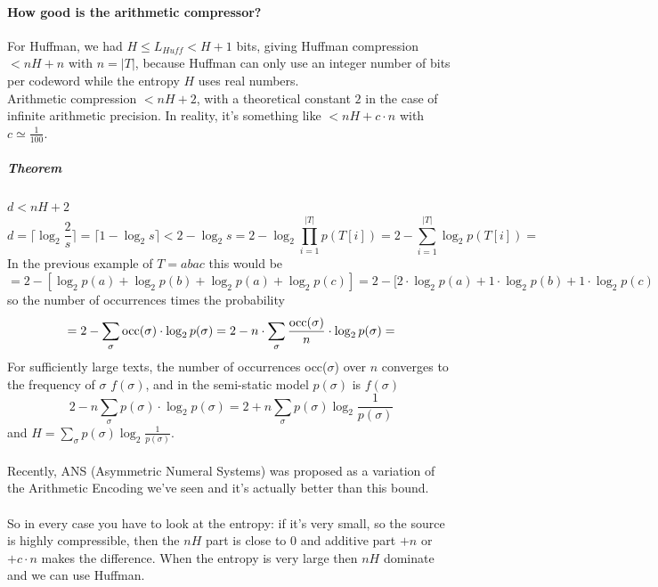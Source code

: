 \documentclass[10pt]{report}
\begin{document}
\paragraph{How good is the arithmetic compressor?} For Huffman, we had $H\leq L_{Huff} < H+1$ bits, giving Huffman compression $< nH+n$ with $n=|T|$, because Huffman can only use an integer number of bits per codeword while the entropy $H$ uses real numbers.\\
Arithmetic compression $< nH + 2$, with a theoretical constant $2$ in the case of infinite arithmetic precision. In reality, it's something like $< nH + c\cdot n$ with $c\simeq\frac{1}{100}$.
\subparagraph{Theorem} $d< nH + 2$
$$d = \lceil\log_2\frac{2}{s}\rceil = \lceil 1-\log_2 s\rceil < 2 - \log_2 s = 2-\log_2\prod_{i=1}^{|T|}p(T[i]) = 2 - \sum_{i=1}^{|T|} \log_2 p(T[i]) =$$
In the previous example of $T = abac$ this would be $=2- [\log_2 p(a)+\log_2 p(b)+\log_2 p(a) + \log_2 p(c)] = 2 - [2\cdot\log_2 p(a) + 1\cdot\log_2 p(b) + 1\cdot \log_2 p(c)$ so the number of occurrences times the probability
$$ = 2 - \sum_\sigma \hbox{occ}(\sigma)\cdot\log_2 p(\sigma) = 2 - n\cdot\sum_\sigma \frac{\hbox{occ}(\sigma)}{n}\cdot\log_2 p(\sigma) = $$
For sufficiently large texts, the number of occurrences occ($\sigma$) over $n$ converges to the frequency of $\sigma$ $f(\sigma)$, and in the semi-static model $p(\sigma)$ is $f(\sigma)$ 
$$2 - n\sum_\sigma p(\sigma)\cdot\log_2 p(\sigma) = 2 + n\sum_\sigma p(\sigma)\log_2\frac{1}{p(\sigma)}$$ and $H = \sum_\sigma p(\sigma)\log_2\frac{1}{p(\sigma)}$.\\\\
Recently, ANS (Asymmetric Numeral Systems) was proposed as a variation of the Arithmetic Encoding we've seen and it's actually better than this bound.\\\\
So in every case you have to look at the entropy: if it's very small, so the source is highly compressible, then the $nH$ part is close to $0$ and additive part $+n$ or $+c\cdot n$ makes the difference. When the entropy is very large then $nH$ dominate and we can use Huffman.
\end{document}
